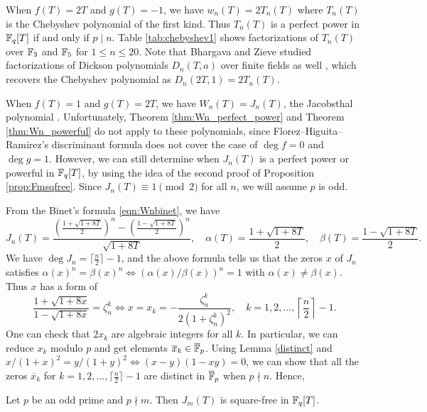 \begin{example}
    When $f(T) = 2T$ and $g(T) = -1$, we have $w_n(T) = 2 T_n(T)$ where $T_n(T)$ is the Chebyshev polynomial of the first kind.
    Thus $T_n(T)$ is a perfect power in $\mathbb{F}_q[T]$ if and only if $p \mid n$.
    Table \ref{tab:chebyshev1} shows factorizations of $T_n(T)$ over $\mathbb{F}_3$ and $\mathbb{F}_5$ for $1 \le n \le 20$.
    Note that Bhargava and Zieve studied factorizations of Dickson polynomials $D_n(T, a)$ over finite fields as well \cite{bhargava1999factoring}, which recovers the Chebyshev polynomial as $D_n(2T, 1) = 2 T_n(T)$.
\end{example}


When $f(T) = 1$ and $g(T) = 2T$, we have $W_n(T) = J_n(T)$, the Jacobsthal polynomial \cite{horadam1997jacobsthal}.
Unfortunately, Theorem \ref{thm:Wn_perfect_power} and Theorem \ref{thm:Wn_powerful} do not apply to these polynomials, since Florez--Higuita--Ramirez's discriminant formula \cite[Theorem 4]{florez2019resultant} does not cover the case of $\deg f = 0$ and $\deg g = 1$.
However, we can still determine when $J_n(T)$ is a perfect power or powerful in $\mathbb{F}_q[T]$, by using the idea of the second proof of Proposition \ref{prop:Fmsqfree}.
Since $J_n(T) \equiv 1 \pmod{2}$ for all $n$, we will assume $p$ is odd.

From the Binet's formula \eqref{eqn:Wnbinet}, we have
\[
J_n(T) = \frac{\left(\frac{1 + \sqrt{1 + 8T}}{2}\right)^n - \left(\frac{1 - \sqrt{1 + 8T}}{2}\right)^n}{\sqrt{1 + 8T}}, \quad \alpha(T) = \frac{1 + \sqrt{1 + 8T}}{2}, \quad \beta(T) = \frac{1 - \sqrt{1 + 8T}}{2}.
\]
We have $\deg J_n = \lceil \frac{n}{2} \rceil - 1$, and the above formula tells us that the zeros $x$ of $J_n$ satisfies $\alpha(x)^n = \beta(x)^n \Leftrightarrow (\alpha(x) / \beta(x))^n = 1$ with $\alpha(x) \ne \beta(x)$.
Thus $x$ has a form of
\[
\frac{1 + \sqrt{1 + 8x}}{1 - \sqrt{1 + 8x}} = \zeta_n^k \Leftrightarrow x = x_k = - \frac{\zeta_n^k}{2(1 + \zeta_n^k)^2},\quad k = 1, 2, \dots, \left \lceil \frac{n}{2} \right \rceil - 1.
\]
One can check that $2x_k$ are algebraic integers for all $k$.
In particular, we can reduce $x_k$ modulo $p$ and get elements $\overline{x}_k \in \overline{\mathbb{F}}_p$.
Using Lemma \ref{distinct} and $x / (1 + x)^2 = y / (1 + y)^2 \Leftrightarrow (x - y)(1 - xy) = 0$, we can show that all the zeros $\overline{x}_k$ for $k = 1, 2, \dots, \lceil \frac{n}{2} \rceil - 1$ are distinct in $\overline{\mathbb{F}}_p$ when $p \nmid n$. Hence,
\begin{proposition}
    \label{thm:Jmsqfree}
    Let $p$ be an odd prime and $p \nmid m$. Then $J_m(T)$ is square-free in $\mathbb{F}_q[T]$.
\end{proposition}

